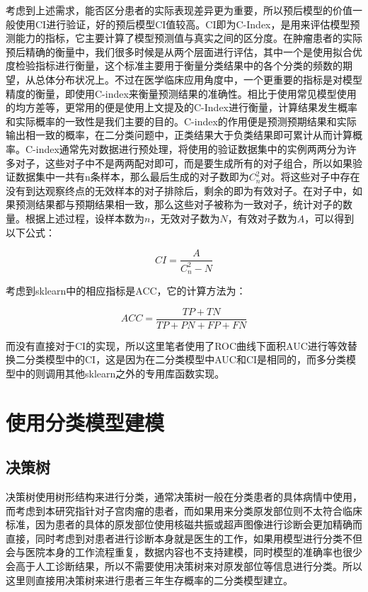考虑到上述需求，能否区分患者的实际表现差异更为重要，所以预后模型的价值一般使用CI进行验证，好的预后模型CI值较高。CI即为C-Index，是用来评估模型预测能力的指标，它主要计算了模型预测值与真实之间的区分度。在肿瘤患者的实际预后精确的衡量中，我们很多时候是从两个层面进行评估，其中一个是使用拟合优度检验指标进行衡量，这个标准主要用于衡量分类结果中的各个分类的频数的期望，从总体分布状况上。不过在医学临床应用角度中，一个更重要的指标是对模型精度的衡量，即使用C-index来衡量预测结果的准确性。相比于使用常见模型使用的均方差等，更常用的便是使用上文提及的C-Index进行衡量，计算结果发生概率和实际概率的一致性是我们主要的目的。C-index的作用便是预测预期结果和实际输出相一致的概率，在二分类问题中，正类结果大于负类结果即可累计从而计算概率。C-index通常先对数据进行预处理，将使用的验证数据集中的实例两两分为许多对子，这些对子中不是两两配对即可，而是要生成所有的对子组合，所以如果验证数据集中一共有n条样本，那么最后生成的对子数即为$C_{n}^{2}$对。将这些对子中存在没有到达观察终点的无效样本的对子排除后，剩余的即为有效对子。在对子中，如果预测结果都与预期结果相一致，那么这些对子被称为一致对子，统计对子的数量。根据上述过程，设样本数为$n$，无效对子数为$N$，有效对子数为$A$，可以得到以下公式：

$$
CI = \frac{A}{C_{n}^{2} - N}
$$

考虑到sklearn中的相应指标是ACC，它的计算方法为：

$$
ACC = \frac{TP+TN}{TP+PN+FP+FN}
$$

而没有直接对于CI的实现，所以这里笔者使用了ROC曲线下面积AUC进行等效替换二分类模型中的CI，这是因为在二分类模型中AUC和CI是相同的，而多分类模型中的则调用其他sklearn之外的专用库函数实现。

\section{使用分类模型建模}

\subsection{决策树}

决策树使用树形结构来进行分类，通常决策树一般在分类患者的具体病情中使用，而考虑到本研究指针对子宫肉瘤的患者，而如果用来分类原发部位则不太符合临床标准，因为患者的具体的原发部位使用核磁共振或超声图像进行诊断会更加精确而直接，同时考虑到对患者进行诊断本身就是医生的工作，如果用模型进行分类不但会与医院本身的工作流程重复，数据内容也不支持建模，同时模型的准确率也很少会高于人工诊断结果，所以不需要使用决策树来对原发部位等信息进行分类。所以这里则直接用决策树来进行患者三年生存概率的二分类模型建立。

